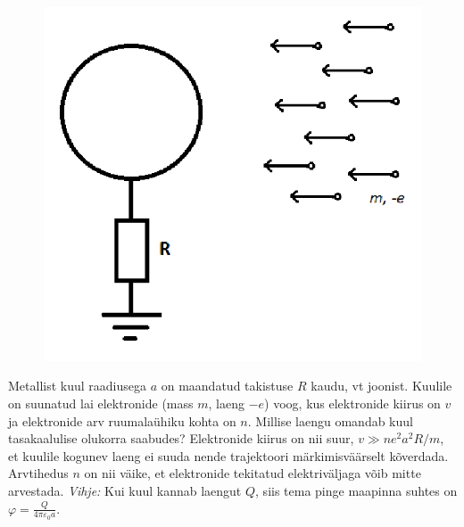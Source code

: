 \documentclass[10pt]{article}
\begin{document}

\begin{figure}
  \vspace{-25pt}
  \begin{center}
  \includegraphics[width=\linewidth]{2024-v2g-09-yl.png}
  \vspace{-30pt}
  \end{center}
\end{figure}



Metallist kuul raadiusega $a$ on maandatud takistuse $R$ kaudu, vt joonist. Kuulile on suunatud lai elektronide (mass $m$, laeng $-e$) voog, kus elektronide kiirus on $v$ ja elektronide arv ruumalaühiku kohta on  $n$. Millise laengu omandab kuul tasakaalulise olukorra saabudes? Elektronide kiirus on nii suur, $v \gg n e^2 a^2 R / m$, et kuulile kogunev laeng ei suuda nende trajektoori märkimisväärselt kõverdada. Arvtihedus $n$ on nii väike, et elektronide tekitatud elektriväljaga võib mitte arvestada. \textit{Vihje:} Kui kuul kannab laengut $Q$, siis tema pinge maapinna suhtes on $\varphi = \frac{Q}{4\pi\varepsilon_0 a}$.
\probend
\bigskip

\end{document}
